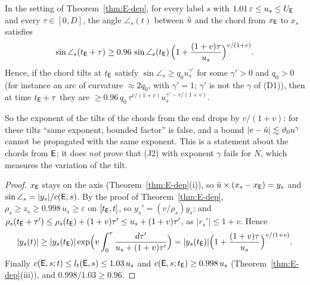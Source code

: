 \begin{proposition}\label{prop:E-depsharp}
In the setting of Theorem~\ref{thm:E-dep}, for every label $s$ with $1.01\,\varepsilon\le u_s\le U_{\mathsf E}$ and every $\tau\in[0,D]$, the
angle $\angle_s(t)$ between $\hat u$ and the chord from $x_{\mathsf E}$ to $x_s$ satisfies
\[
\sin\angle_s(t_{\mathsf E}+\tau)\ge0.96\,\sin\angle_s(t_{\mathsf E})\,\Bigl(1+\frac{(1+v)\tau}{u_s}\Bigr)^{v/(1+v)} .
\]
Hence, if the chord tilts at $t_{\mathsf E}$ satisfy $\sin\angle_s\ge q_0u_s^{\gamma'}$ for some $\gamma'>0$ and $q_0>0$ (for instance an arc
of curvature $\approx2q_0$, with $\gamma'=1$; $\gamma'$ is not the $\gamma$ of (D1)), then at time $t_{\mathsf E}+\tau$ they are
$\ge0.96\,q_0\,\tau^{v/(1+v)}u_s^{\gamma'-v/(1+v)}$.
\end{proposition}
So the exponent of the tilts of the chords from the end drops by $v/(1+v)$: for these tilts ``same exponent, bounded factor'' is
false, and a bound $|e-\hat u|\lesssim\vartheta_0u^\gamma$ cannot be propagated with the same exponent. This is a statement about the
chords from $\mathsf E$; it does \emph{not} prove that (J2) with exponent $\gamma$ fails for $N$, which measures the variation of the
tilt.
\begin{proof}
$x_{\mathsf E}$ stays on the axis (Theorem~\ref{thm:E-dep}(i)), so $\hat u\times(x_s-x_{\mathsf E})=y_s$ and $\sin\angle_s=|y_s|/c(\mathsf E,s)$. By
the proof of Theorem~\ref{thm:E-dep}, $\rho_s\ge z_s\ge0.998\,u_s\ge\varepsilon$ on $[t_{\mathsf E},t]$, so $y_s'=(v/\rho_s)y_s$; and
$\rho_s(t_{\mathsf E}+\tau')\le\rho_s(t_{\mathsf E})+(1+v)\tau'\le u_s+(1+v)\tau'$, as $|r_s'|\le1+v$. Hence
\[
|y_s(t)|\ge|y_s(t_{\mathsf E})|\exp\Bigl(v\int_0^\tau\frac{d\tau'}{u_s+(1+v)\tau'}\Bigr)=|y_s(t_{\mathsf E})|\Bigl(1+\frac{(1+v)\tau}{u_s}\Bigr)^{v/(1+v)}.
\]
Finally $c(\mathsf E,s;t)\le l_t(\mathsf E,s)\le1.03\,u_s$ and $c(\mathsf E,s;t_{\mathsf E})\ge0.998\,u_s$ (Theorem~\ref{thm:E-dep}(iii)), and
$0.998/1.03\ge0.96$.
\end{proof}

